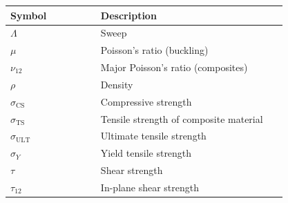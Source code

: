 \hfill
\begin{minipage}[t]{0.31\textwidth}
\begin{tabular}{@{}%
>{\raggedright\arraybackslash}p{0.30\linewidth}
>{\raggedright\arraybackslash}p{0.62\linewidth}@{}}
\toprule
\textbf{Symbol} & \textbf{Description} \\
\midrule
$\Lambda$           & Sweep \\
$\mu$ & Poisson's ratio (buckling) \\
$\nu_{12}$               & Major Poisson's ratio (composites) \\
$\rho$                   & Density \\
$\sigma_{\mathrm{CS}}$   & Compressive strength \\
$\sigma_{\mathrm{TS}}$   & Tensile strength of composite material \\
$\sigma_{\mathrm{ULT}}$  & Ultimate tensile strength \\
$\sigma_Y$               & Yield tensile strength \\
$\tau$                   & Shear strength \\
$\tau_{12}$                   & In-plane shear strength \\

\bottomrule
\end{tabular}
\end{minipage}
\endgroup
\newpage